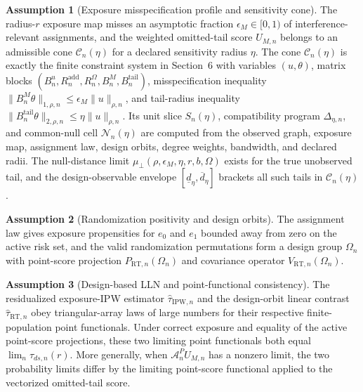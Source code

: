 \documentclass[11pt]{article}
\theoremstyle{definition}
\newtheorem{assumption}{Assumption}
\theoremstyle{plain}
\theoremstyle{remark}
\begin{document}
\begin{assumption}[Exposure misspecification profile and sensitivity cone]\label{ass:misspec-profile}
The radius-\(r\) exposure map misses an asymptotic fraction
\(\epsilon_M\in[0,1)\) of interference-relevant assignments, and the weighted
omitted-tail score \(U_{M,n}\) belongs to an admissible cone
\(\mathcal C_n(\eta)\) for a declared sensitivity radius \(\eta\).  The
cone \(\mathcal C_n(\eta)\) is exactly the finite constraint system in
Section~6 with variables \((u,\theta)\), matrix blocks
\((B^u_n,R^{\mathrm{add}}_n,R^\Omega_n,B^M_n,B^{\mathrm{tail}}_n)\),
misspecification inequality \(\|B^M_n\theta\|_{1,\rho,n}\le
\epsilon_M\|u\|_{\rho,n}\), and tail-radius inequality
\(\|B^{\mathrm{tail}}_n\theta\|_{2,\rho,n}\le\eta\|u\|_{\rho,n}\).  Its
unit slice \(S_n(\eta)\), compatibility program \(\Delta_{\eta,n}\), and
common-null cell \(\mathcal N_n(\eta)\) are computed from the observed graph,
exposure map, assignment law, design orbits, degree weights, bandwidth, and
declared radii.  The null-distance limit
\(\mu_{\perp}(\rho,\epsilon_M,\eta,r,b,\Omega)\) exists for the true
unobserved tail, and the design-observable envelope
\([\underline d_\eta,\overline d_\eta]\) brackets all such tails in
\(\mathcal C_n(\eta)\).
\end{assumption}

\begin{assumption}[Randomization positivity and design orbits]\label{ass:design-orbits}
The assignment law gives exposure propensities for \(e_0\) and \(e_1\) bounded
away from zero on the active risk set, and the valid randomization permutations
form a design group \(\Omega_n\) with point-score projection
\(P_{\mathrm{RT},n}(\Omega_n)\) and covariance operator
\(V_{\mathrm{RT},n}(\Omega_n)\).
\end{assumption}

\begin{assumption}[Design-based LLN and point-functional consistency]\label{ass:design-lln}
The residualized exposure-IPW estimator \(\hat\tau_{\mathrm{IPW},n}\) and the
design-orbit linear contrast \(\hat\tau_{\mathrm{RT},n}\) obey triangular-array
laws of large numbers for their respective finite-population point
functionals.  Under correct exposure and equality of the active point-score
projections, these two limiting point functionals both equal
\(\lim_n\tau_{ds,n}(r)\).  More generally, when
\(\mathcal A^P_n U_{M,n}\) has a nonzero limit, the two probability limits
differ by the limiting point-score functional applied to the vectorized
omitted-tail score.
\end{assumption}
\end{document}
